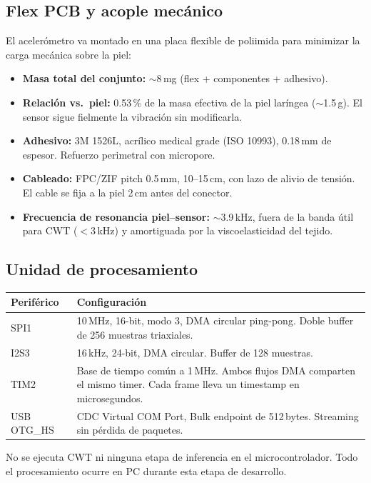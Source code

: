 \documentclass[10pt,a4paper]{article}
\begin{document}
\subsection*{Flex PCB y acople mecánico}

El acelerómetro va montado en una placa flexible de poliimida para minimizar
la carga mecánica sobre la piel:

\begin{itemize}
\item \textbf{Masa total del conjunto:} $\sim$8\,mg (flex + componentes + adhesivo).
\item \textbf{Relación vs.\ piel:} 0.53\,\% de la masa efectiva de la piel laríngea
($\sim$1.5\,g). El sensor sigue fielmente la vibración sin modificarla.
\item \textbf{Adhesivo:} 3M 1526L, acrílico medical grade (ISO 10993),
0.18\,mm de espesor. Refuerzo perimetral con micropore.
\item \textbf{Cableado:} FPC/ZIF pitch 0.5\,mm, 10--15\,cm, con lazo de alivio
de tensión. El cable se fija a la piel 2\,cm antes del conector.
\item \textbf{Frecuencia de resonancia piel--sensor:} $\sim$3.9\,kHz,
fuera de la banda útil para CWT ($<$3\,kHz) y amortiguada por la
viscoelasticidad del tejido.
\end{itemize}

\subsection*{Unidad de procesamiento}

\begin{tabularx}{\textwidth}{l X}
\toprule
\textbf{Periférico} & \textbf{Configuración} \\
\midrule
SPI1 & 10\,MHz, 16-bit, modo 3, DMA circular ping-pong.
Doble buffer de 256 muestras triaxiales.\\
I2S3 & 16\,kHz, 24-bit, DMA circular. Buffer de 128 muestras.\\
TIM2 & Base de tiempo común a 1\,MHz. Ambos flujos DMA comparten
el mismo timer. Cada frame lleva un timestamp en microsegundos.\\
USB OTG\_HS & CDC Virtual COM Port, Bulk endpoint de 512\,bytes.
Streaming sin pérdida de paquetes.\\
\bottomrule
\end{tabularx}

No se ejecuta CWT ni ninguna etapa de inferencia en el microcontrolador.
Todo el procesamiento ocurre en PC durante esta etapa de desarrollo.
\end{document}
